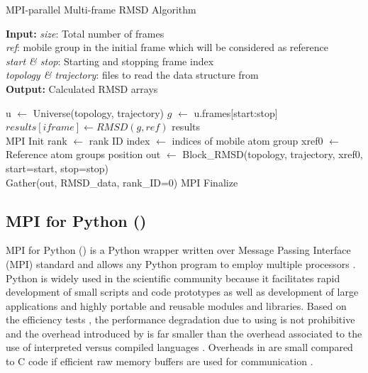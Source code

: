 \begin{algorithm}[ht!]
	\scriptsize
	\caption{MPI-parallel Multi-frame RMSD Algorithm}
	\label{alg:RMSD}
	\hspace*{\algorithmicindent} \textbf{Input:} \emph{size}: Total number of frames \\
	\hspace*{\algorithmicindent} \emph{ref}: mobile group in the initial frame which will be considered as reference \\
	\hspace*{\algorithmicindent} \emph{start \& stop}: Starting and stopping frame index\\
	\hspace*{\algorithmicindent} \emph{topology \& trajectory}: files to read the data structure from \\
	\hspace*{\algorithmicindent} \textbf{Output:} Calculated RMSD arrays
	\begin{algorithmic}[1]
		\State u $\leftarrow$ Universe(topology, trajectory)
		\State $g$ $\leftarrow$ u.frames[start:stop]
		\State $results[iframe] \leftarrow RMSD(g, ref)$
		\EndFor
		\State \Return results
		\EndProcedure
		\\        
		\State MPI Init
		\State rank $\leftarrow$ rank ID
		\State index $\leftarrow$ indices of mobile atom group
		\State xref0 $\leftarrow$ Reference atom group\textsc{}s position
		\State out $\leftarrow$ Block\_RMSD(topology, trajectory, xref0, start=start, stop=stop)
		\\
		\State Gather(out, RMSD\_data, rank\_ID=0)
		\State MPI Finalize
	\end{algorithmic}
\end{algorithm}


\subsection{MPI for Python ()}
MPI for Python () is a Python wrapper written over Message Passing Interface (MPI) standard and allows any Python program to employ multiple processors \cite{Dalcin:2011aa, Dalcin:2005aa}.
Python is widely used in the scientific community because it facilitates rapid development of small scripts and code prototypes as well as development of large applications and highly portable and reusable modules and libraries.
Based on the efficiency tests \cite{Dalcin:2011aa, Dalcin:2005aa}, the performance degradation due to using  is not prohibitive and the overhead introduced by  is far smaller than the overhead associated to the use of interpreted versus compiled languages \cite{GAiN}.
Overheads in  are small compared to C code if efficient raw memory buffers are used for communication \cite{Dalcin:2011aa}.

